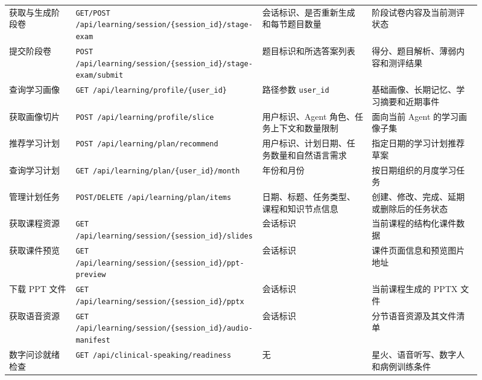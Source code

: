 {\begin{longtable}{
  p{0.14\linewidth}
  p{0.31\linewidth}
  p{0.23\linewidth}
  p{0.23\linewidth}
}
  获取与生成阶段卷
  & \texttt{GET/POST /api/learning/session/\{session\_id\}/stage-exam}
  & 会话标识、是否重新生成和每节题目数量
  & 阶段试卷内容及当前测评状态 \\

  提交阶段卷
  & \texttt{POST /api/learning/session/\{session\_id\}/stage-exam/submit}
  & 题目标识和所选答案列表
  & 得分、题目解析、薄弱内容和测评结果 \\

  查询学习画像
  & \texttt{GET /api/learning/profile/\{user\_id\}}
  & 路径参数 \texttt{user\_id}
  & 基础画像、长期记忆、学习摘要和近期事件 \\

  获取画像切片
  & \texttt{POST /api/learning/profile/slice}
  & 用户标识、Agent 角色、任务上下文和数量限制
  & 面向当前 Agent 的学习画像子集 \\

  推荐学习计划
  & \texttt{POST /api/learning/plan/recommend}
  & 用户标识、计划日期、任务数量和自然语言需求
  & 指定日期的学习计划推荐草案 \\

  查询学习计划
  & \texttt{GET /api/learning/plan/\{user\_id\}/month}
  & 年份和月份
  & 按日期组织的月度学习任务 \\

  管理计划任务
  & \texttt{POST/DELETE /api/learning/plan/items}
  & 日期、标题、任务类型、课程和知识节点信息
  & 创建、修改、完成、延期或删除后的任务状态 \\

  获取课程资源
  & \texttt{GET /api/learning/session/\{session\_id\}/slides}
  & 会话标识
  & 当前课程的结构化课件数据 \\

  获取课件预览
  & \texttt{GET /api/learning/session/\{session\_id\}/ppt-preview}
  & 会话标识
  & 课件页面信息和预览图片地址 \\

  下载 PPT 文件
  & \texttt{GET /api/learning/session/\{session\_id\}/pptx}
  & 会话标识
  & 当前课程生成的 PPTX 文件 \\

  获取语音资源
  & \texttt{GET /api/learning/session/\{session\_id\}/audio-manifest}
  & 会话标识
  & 分节语音资源及其文件清单 \\

  数字问诊就绪检查
  & \texttt{GET /api/clinical-speaking/readiness}
  & 无
  & 星火、语音听写、数字人和病例训练条件 \\


\end{longtable}}
